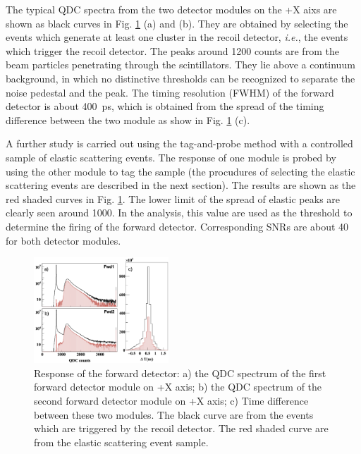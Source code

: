 \documentclass[number,5p]{elsarticle}
\begin{document}
The typical QDC spectra from the two detector modules on the +X aixs are shown as
black curves in Fig. \ref{fig:fwd_performance} (a) and (b).
They are obtained by selecting the events which generate at least one cluster in the recoil detector, \textit{i.e.}, the events which trigger the recoil detector.
The peaks around \num{1200} counts are from the beam particles penetrating through the scintillators.
They lie above a continuum background, in which no distinctive thresholds can be recognized to separate the noise pedestal and the peak.
The timing resolution (FWHM) of the forward detector is about \SI{400}{ps}, which is obtained from the spread of the timing difference between the two module as show in Fig. \ref{fig:fwd_performance} (c).

A further study is carried out using the tag-and-probe method with a controlled
sample of elastic scattering events.
The response of one module is probed by using the other module to tag the sample
(the procudures of selecting the elastic scattering events are described in the
next section).
The results are shown as the red shaded curves in Fig. \ref{fig:fwd_performance}.
The lower limit of the spread of elastic peaks are clearly seen around \num{1000}.
In the analysis, this value are used as the threshold to determine the firing of the forward detector.
Corresponding SNRs are about \num{40} for both detector modules.
\begin{figure}[htb!]
  \centering
  \includegraphics[width=0.45\textwidth]{./fwd_performance_elastic.png}
  \caption{Response of the forward detector: a) the QDC spectrum of the first forward detector module on +X axis;
    b) the QDC spectrum of the second forward detector module on +X axis; c) Time difference between these two modules.
    The black curve are from the events which are triggered by the recoil
    detector.
    The red shaded curve are from the elastic scattering event sample.
  }
  \label{fig:fwd_performance}
\end{figure}
\end{document}
